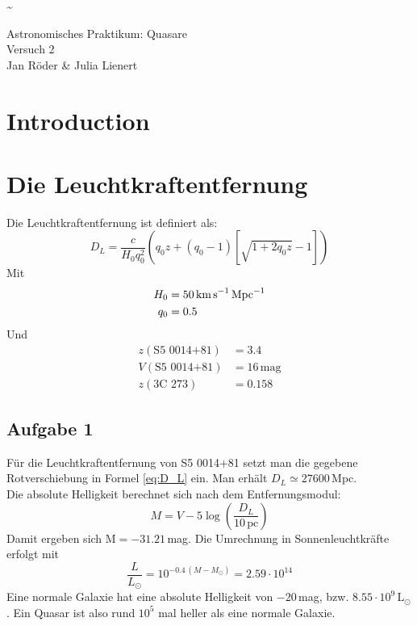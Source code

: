 \documentclass[12pt]{article}
\begin{document}
	\pagestyle{empty}
	\textasciitilde

\begin{titlepage}
    \centering
	\huge{Astronomisches Praktikum: Quasare}\\
	\bigskip
    \large{Versuch 2}\\
    \huge{Jan R\"{o}der \& Julia Lienert}
\end{titlepage}



\tableofcontents
\pagebreak

\section{Introduction}

\section{Die Leuchtkraftentfernung}

Die Leuchtkraftentfernung ist definiert als:
\begin{equation}\label{eq:D_L}
	D_L=\frac{c}{H_0q_0^2}\left( q_0z+(q_0-1)\left[  \sqrt{1+2q_0z} -1 \right]  \right)
\end{equation}
Mit
\begin{align*}
	H_0 &= 50\text{\,km\,s}^{-1}\,\text{Mpc}^{-1} \\
	q_0 &= 0.5
\end{align*}
Und
\begin{align*}
	z(\text{S5 0014+81}) &= 3.4 \\
	V(\text{S5 0014+81}) &= 16\,\text{mag} \\
	z(\text{3C 273}) &= 0.158 
\end{align*}

\subsection{Aufgabe 1}

F\"{u}r die Leuchtkraftentfernung von S5 0014+81 setzt man die gegebene Rotverschiebung in Formel \ref{eq:D_L} ein. Man erh\"{a}lt $D_L\simeq27600\,$Mpc. \\
Die absolute Helligkeit berechnet sich nach dem Entfernungsmodul:
\begin{equation} \label{eq:dist_mod}
	M=V-5 \log\left(\frac{D_L}{10\,\text{pc}}\right)
\end{equation}
Damit ergeben sich $\text{M} = -31.21\,$mag. Die Umrechnung in Sonnenleuchtkr\"{a}fte erfolgt mit
\begin{equation}
	\frac{L}{L_\odot} = 10^{-0.4\,(M-M_\odot)} = 2.59\cdot 10^{14}
\end{equation}
Eine normale Galaxie hat eine absolute Helligkeit von $-20\,$mag, bzw. $8.55\cdot 10^9\,\text{L}_\odot$. Ein Quasar ist also rund $10^5$ mal heller als eine normale Galaxie.
 
\end{document}
